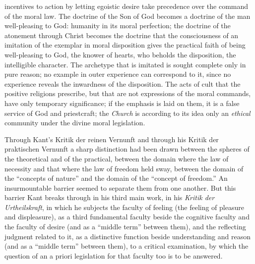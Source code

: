 incentives to action by letting egoistic desire take precedence over the
command of the moral law. The doctrine of the Son of God becomes a
doctrine of the man well-pleasing to God: humanity in its moral
perfection; the doctrine of the atonement through Christ becomes the
doctrine that the consciousness of an imitation of the exemplar in moral
disposition gives the practical faith of being well-pleasing to God, the
knower of hearts, who beholds the disposition, the intelligible
character. The archetype that is imitated is sought complete only in
pure reason; no example in outer experience can correspond to it, since
no experience reveals the inwardness of the disposition. The acts of
cult that the positive religions prescribe, but that are not expressions
of the moral commands, have only temporary significance; if the emphasis
is laid on them, it is a false service of God and priestcraft; the
\emph{Church} is according to its idea only an \emph{ethical} community
under the divine moral legislation.

\divrule

Through Kant's Kritik der reinen Vernunft and through his Kritik der
praktischen Vernunft a sharp distinction had been drawn between the
spheres of the theoretical and of the practical, between the domain
where the law of necessity and that where the law of freedom
held sway, between the domain of the ``concepts of nature'' and the
domain of the ``concept of freedom.'' An insurmountable barrier seemed
to separate them from one another. But this barrier Kant breaks through
in his third main work, in his \emph{Kritik der Urtheilskraft}, in which
he subjects the faculty of feeling (the feeling of pleasure and
displeasure), as a third fundamental faculty beside the cognitive
faculty and the faculty of desire (and as a ``middle term'' between
them), and the reflecting judgment related to it, as a distinctive
function beside understanding and reason (and as a ``middle term''
between them), to a critical examination, by which the question of an
a priori legislation for that faculty too is to be answered.


